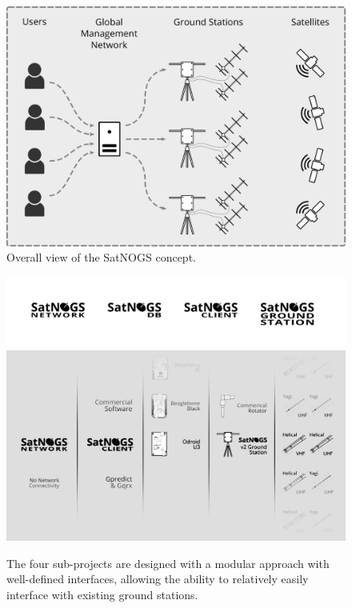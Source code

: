 \documentclass[conference]{IEEEtran}
\begin{document}
\begin{figure}[htbp]
\centering
\includegraphics[width=\columnwidth]{fig/overall-system}
\caption{Overall view of the SatNOGS concept.}
\label{f:overall}
\end{figure}

\begin{figure}[htbp]
\centering
\includegraphics[width=\columnwidth]{fig/four-components-titles-invert}
\includegraphics[width=\columnwidth]{fig/modular-options}
\caption{The four sub-projects are designed with a modular approach with well-defined interfaces, allowing the ability to relatively easily interface with existing ground stations.}
\label{f:modular}
\end{figure}
\end{document}
